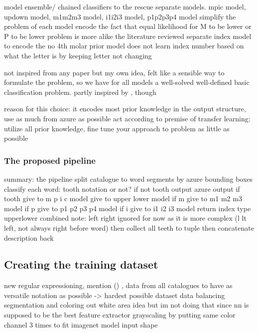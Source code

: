 \documentclass{article}
\begin{document}
    model ensemble/ chained classifiers to the rescue
        separate models. mpic model, updown model, m1m2m3 model, i1i2i3 model, p1p2p3p4 model
            simplify the problem of each model
            encode the fact that equal likelihood for M to be lower or P to be lower
            problem is more alike the literature reviewed
            separate index model to encode
                the no 4th molar prior
                model does not learn index number based on what the letter is by keeping letter not changing

not inspired from any paper but my own idea, felt like a sensible way to formulate the problem, 
so we have for all models a well-solved well-defined basic classification problem. partly inspired by \cite{tibetan_ocr}, though

reason for this choice: it encodes most prior knowledge in the output structure, use as much from azure as possible
    act according to premise of transfer learning: utilize all prior knowledge, fine tune your approach to problem as little as possible

\subsubsection{The proposed pipeline}

summary: the pipeline
split catalogue to word segments by azure bounding boxes 
classify each word: tooth notation or not?
if not tooth output azure output
if tooth   
    give to m p i c model
    give to upper lower model 
    if m
        give to m1 m2 m3 model
    if p
        give to p1 p2 p3 p4 model
    if i
        give to i1 i2 i3 model
    return index type upperlower combined
    note: left right ignored for now as it is more complex (l lt left, not always right before word)
then collect all teeth to tuple 
then concatenate description back       

\subsection{Creating the training dataset}

new
regular expressioning, mention () ,
data from all catalogues to have as versatile notation as possible -> hardest possible dataset
data balancing
segmentation and coloring out white area idea 
    but im not doing that since nn is supposed to be the best feature extractor
grayscaling by putting same color channel 3 times to fit imagenet model input shape
\end{document}
